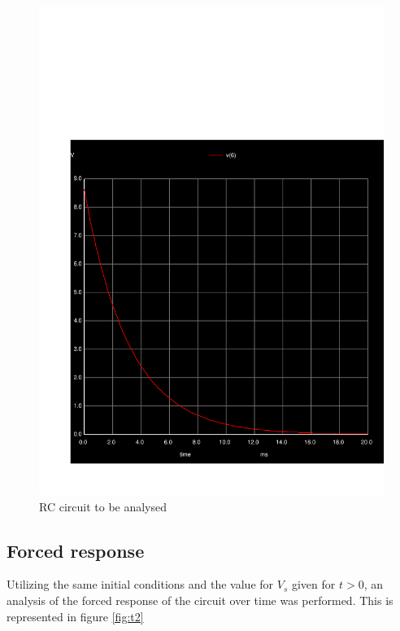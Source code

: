   \begin{figure}[H] \centering
    \includegraphics[width=1\linewidth]{../sim/trans3.pdf}
    \caption{RC circuit to be analysed}
    \label{fig:p3}
    \end{figure}

  \subsection{Forced response}

 Utilizing the same initial conditions and the value for $V_s$ given for $t>0$,
 an analysis of the forced response of the circuit over time was performed.
This is represented in figure \ref{fig:t2}

